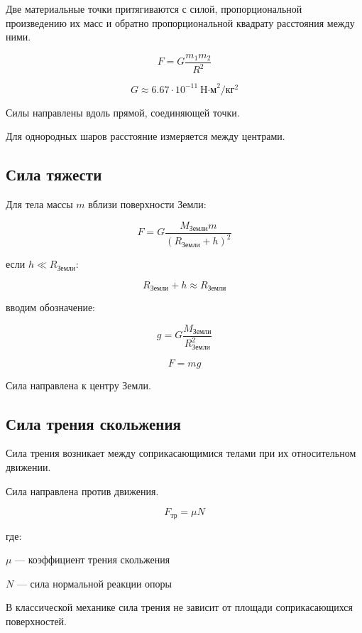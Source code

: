 \documentclass[a4paper,12pt]{article}
\begin{document}
\begin{theorembox}
Две материальные точки притягиваются с силой, пропорциональной произведению их масс и обратно пропорциональной квадрату расстояния между ними.
\end{theorembox}

\[
F
=
G \frac{m_1 m_2}{R^2}
\]

\[
G \approx 6.67 \cdot 10^{-11}
\ \text{Н·м}^2/\text{кг}^2
\]

Силы направлены вдоль прямой, соединяющей точки.

Для однородных шаров расстояние измеряется между центрами.

\vspace{0.8em}

\subsection*{Сила тяжести}

Для тела массы $m$ вблизи поверхности Земли:

\[
F
=
G
\frac{M_{\text{Земли}} m}{(R_{\text{Земли}}+h)^2}
\]

если $h \ll R_{\text{Земли}}$:

\[
R_{\text{Земли}} + h \approx R_{\text{Земли}}
\]

вводим обозначение:

\[
g
=
G
\frac{M_{\text{Земли}}}{R_{\text{Земли}}^2}
\]

\[
F = mg
\]

Сила направлена к центру Земли.

\vspace{0.8em}

\subsection*{Сила трения скольжения}

Сила трения возникает между соприкасающимися телами при их относительном движении.

Сила направлена против движения.

\[
F_{\text{тр}} = \mu N
\]

где:

$\mu$ — коэффициент трения скольжения

$N$ — сила нормальной реакции опоры

В классической механике сила трения не зависит от площади соприкасающихся поверхностей.

\vspace{0.8em}
\end{document}
